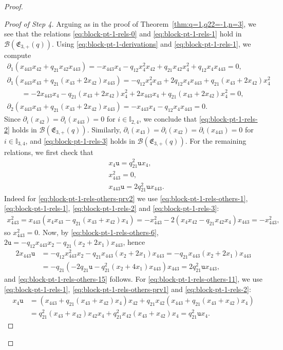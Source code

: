 \documentclass[pdftex]{sigma}
\numberwithin{equation}{section}
\newcommand{\toba}{\mathscr B}
\newcommand{\I}{{\mathbb I}}
\newcommand{\ut}{\mathtt{u}}
\newcommand{\eny}{\mathfrak{E}}
\begin{document}
\begin{proof}
\begin{proof}[Proof of Step 4]
Arguing as in the proof of Theorem~\ref{thm:q=1,q22=-1,n=3},
we see that the relations \eqref{eq:block-pt-1-rels-0} and \eqref{eq:block-pt-1-rels-1} hold in $\toba(\eny_{3,+}(q))$.
Using \eqref{eq:block-pt-1-derivations} and \eqref{eq:block-pt-1-rels-1}, we compute
\begin{gather*}
\partial_1 (x_{443}x_{42}+q_{21}x_{42}x_{443}) = -x_{443}x_{4} -q_{12} x_{4}^2 x_{42} + q_{21}x_{42}x_{4}^2 + q_{12}x_{4}x_{443}=0,
\\
\partial_1 (x_{443}x_{43}+q_{21}(x_{43}+2x_{42})x_{443}) =
-q_{12} x_{4}^2x_{43} + 2q_{12}x_{4}x_{443}
 + q_{21}(x_{43}+2x_{42})x_{4}^2
\\ \qquad
{}= -2x_{443}x_{4} -q_{21}(x_{43}+2x_{42})x_4^2
+ 2x_{443}x_{4}+ q_{21}(x_{43}+2x_{42})x_{4}^2 =0,
\\
\partial_2 (x_{443}x_{43}+q_{21}(x_{43}+2x_{42})x_{443}) = -x_{443}x_{4}-q_{12}x_{4}x_{443}=0.
\end{gather*}
Since $\partial_i(x_{42})=\partial_i(x_{443})=0$ for $i\in\I_{2,4}$, we conclude that \eqref{eq:block-pt-1-rels-2} holds in $\toba(\eny_{3,+}(q))$.
Similarly, $\partial_i(x_{43})=\partial_i(x_{42})=\partial_i(x_{443})=0$ for $i\in\I_{3,4}$, and \eqref{eq:block-pt-1-rels-3} holds
in $\toba(\eny_{3,+}(q))$.
For the remaining relations, we first check that
\begin{align}
\label{eq:block-pt-1-rels-others-11}
& x_4 \ut=q_{21}^2\ut x_4,
\\ \label{eq:block-pt-1-rels-others-prv2}
& x_{443}^2=0,
\\ \label{eq:block-pt-1-rels-others-15}
& x_{443}\ut = 2q_{21}^2\ut x_{443}.
\end{align}
Indeed for \eqref{eq:block-pt-1-rels-others-prv2} we use \eqref{eq:block-pt-1-rels-others-1}, \eqref{eq:block-pt-1-rels-1}, \eqref{eq:block-pt-1-rels-2} and \eqref{eq:block-pt-1-rels-3}:
\begin{align*}
x_{443}^2 = x_{443}(x_4x_{43}-q_{21}(x_{43}+x_{42})x_4)
=-x_{443}^2-2(x_{4}x_{42}-q_{21}x_{42}x_4)x_{443}=-x_{443}^2,
\end{align*}
so $x_{443}^2 = 0$. Now, by \eqref{eq:block-pt-1-rels-others-6},
$2\ut=-q_{12}x_{443}x_2-q_{21}(x_2+2x_1)x_{443}$, hence
\begin{align*}
2x_{443}\ut &= -q_{12}x_{443}^2x_2-q_{21}x_{443}(x_2+2x_1)x_{443}=-q_{21}x_{443}(x_2+2x_1)x_{443}
\\
& = -q_{21}(-2q_{21}\ut -q_{21}^2(x_2+4x_1)x_{443})x_{443} =2q_{21}^2\ut x_{443},
\end{align*}
and \eqref{eq:block-pt-1-rels-others-15} follows.
For \eqref{eq:block-pt-1-rels-others-11}, we use \eqref{eq:block-pt-1-rels-1}, \eqref{eq:block-pt-1-rels-others-prv1} and \eqref{eq:block-pt-1-rels-2}:
\begin{align*}
x_4\ut &= (x_{443}+q_{21}(x_{43}+x_{42})x_4)x_{42}+q_{21}x_{42}(x_{443}+q_{21}(x_{43}+x_{42})x_4)
\\
&= q_{21}^2(x_{43}+x_{42})x_{42}x_4+q_{21}^2x_{42}(x_{43}+x_{42})x_4 = q_{21}^2 \ut x_4.
\end{align*}



\end{proof}
\end{proof}
\end{document}
